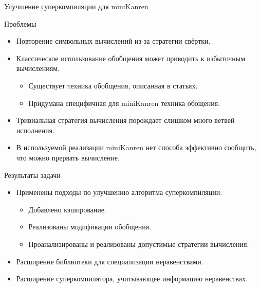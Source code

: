 \documentclass[xcolor=table]{beamer}
\newcommand{\citepres}[1]{{\it \citetitle{#1}}, \citeauthor{#1}, \citeyear{#1}}
\begin{document}
\begin{frame}{Улучшение суперкомпиляции для miniKanren}
\begin{block}{Проблемы}
\begin{itemize}
\item Повторение символьных вычислений из-за стратегии свёртки.
\item Классическое использование обобщения может приводить к избыточным вычислениям.
\begin{itemize}
\item Существует техника обобщения, описанная в статьях\footnotemark.
\item Придумана специфичная для miniKanren техника обощения.
\end{itemize}

\item Тривиальная стратегия вычисления порождает слишком много ветвей исполнения.
\item В используемой реализации miniKanren нет способа эффективно сообщить, что можно прервать вычисление.
\end{itemize}
\end{block}
\footnotetext{\citepres{scPos}}
\end{frame}

\begin{frame}{Результаты задачи}
\begin{itemize}
\item Применены подходы по улучшению алгоритма суперкомпиляции.
\begin{itemize}
\item Добавлено кэширование.
\item Реализованы модификации обобщения.
\item Проанализированы и реализованы допустимые стратегии вычисления.
\end{itemize}
\item Расширение библиотеки для специализации неравенствами.
\item Расширение суперкомпилятора, учитывающее информацию неравенствах.
\end{itemize}
\end{frame}
\end{document}
